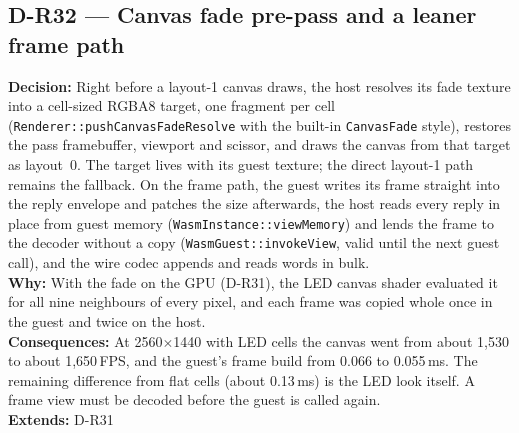 \subsection*{D-R32 --- Canvas fade pre-pass and a leaner frame path}
\begin{decisionbox}[title={D-R32 \quad 2026-09-29}]
\textbf{Decision:} Right before a layout-1 canvas draws, the host resolves its
fade texture into a cell-sized RGBA8 target, one fragment per cell
(\texttt{Renderer::pushCanvasFadeResolve} with the built-in
\texttt{CanvasFade} style), restores the pass framebuffer, viewport and
scissor, and draws the canvas from that target as layout~0. The target lives
with its guest texture; the direct layout-1 path remains the fallback. On the
frame path, the guest writes its frame straight into the reply envelope and
patches the size afterwards, the host reads every reply in place from guest
memory (\texttt{WasmInstance::viewMemory}) and lends the frame to the decoder
without a copy (\texttt{WasmGuest::invokeView}, valid until the next guest
call), and the wire codec appends and reads words in bulk.\\
\textbf{Why:} With the fade on the GPU (D-R31), the LED canvas shader
evaluated it for all nine neighbours of every pixel, and each frame was
copied whole once in the guest and twice on the host.\\
\textbf{Consequences:} At 2560$\times$1440 with LED cells the canvas went from
about 1,530 to about 1,650\,FPS, and the guest's frame build from 0.066 to
0.055\,ms. The remaining difference from flat cells (about 0.13\,ms) is the
LED look itself. A frame view must be decoded before the guest is called
again.\\
\textbf{Extends:} D-R31
\end{decisionbox}

